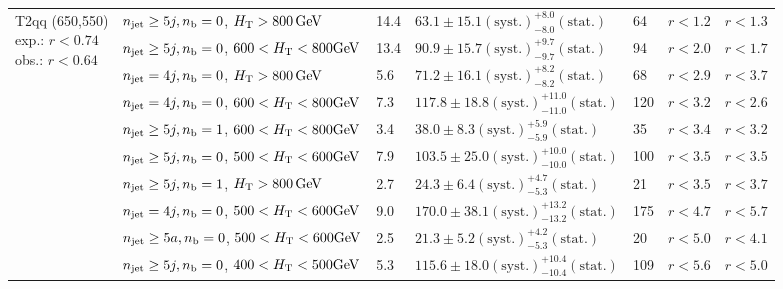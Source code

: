 \begin{table}[h!]
\begin{tabular}{ lllllll }
\multirow{10}{*}{\parbox[t]{2.3cm}{T2qq (650,550)\\exp.: $r<0.74$\\obs.: $r<0.64$}}
 & $n_{\mathrm{jet}} \geq5j,n_{\text{b}} =0$, $\mbox{$H_\text{T}$} > 800 \, \mathrm{GeV}$ & 14.4 & $63.1 \pm 15.1 \mathrm{(syst.)} ^{+8.0}_{-8.0} \mathrm{(stat.)}$ & 64 & $r < 1.2$ & $r < 1.3$\\ 
 & $n_{\mathrm{jet}} \geq5j,n_{\text{b}} =0$, $600 < \mbox{$H_\text{T}$} < 800 \mathrm{GeV}$ & 13.4 & $90.9 \pm 15.7 \mathrm{(syst.)} ^{+9.7}_{-9.7} \mathrm{(stat.)}$ & 94 & $r < 2.0$ & $r < 1.7$\\ 
 & $n_{\mathrm{jet}} =4j,n_{\text{b}} =0$, $\mbox{$H_\text{T}$} > 800 \, \mathrm{GeV}$ & 5.6 & $71.2 \pm 16.1 \mathrm{(syst.)} ^{+8.2}_{-8.2} \mathrm{(stat.)}$ & 68 & $r < 2.9$ & $r < 3.7$\\ 
 & $n_{\mathrm{jet}} =4j,n_{\text{b}} =0$, $600 < \mbox{$H_\text{T}$} < 800 \mathrm{GeV}$ & 7.3 & $117.8 \pm 18.8 \mathrm{(syst.)} ^{+11.0}_{-11.0} \mathrm{(stat.)}$ & 120 & $r < 3.2$ & $r < 2.6$\\ 
 & $n_{\mathrm{jet}} \geq5j,n_{\text{b}} =1$, $600 < \mbox{$H_\text{T}$} < 800 \mathrm{GeV}$ & 3.4 & $38.0 \pm 8.3 \mathrm{(syst.)} ^{+5.9}_{-5.9} \mathrm{(stat.)}$ & 35 & $r < 3.4$ & $r < 3.2$\\ 
 & $n_{\mathrm{jet}} \geq5j,n_{\text{b}} =0$, $500 < \mbox{$H_\text{T}$} < 600 \mathrm{GeV}$ & 7.9 & $103.5 \pm 25.0 \mathrm{(syst.)} ^{+10.0}_{-10.0} \mathrm{(stat.)}$ & 100 & $r < 3.5$ & $r < 3.5$\\ 
 & $n_{\mathrm{jet}} \geq5j,n_{\text{b}} =1$, $\mbox{$H_\text{T}$} > 800 \, \mathrm{GeV}$ & 2.7 & $24.3 \pm 6.4 \mathrm{(syst.)} ^{+4.7}_{-5.3} \mathrm{(stat.)}$ & 21 & $r < 3.5$ & $r < 3.7$\\ 
 & $n_{\mathrm{jet}} =4j,n_{\text{b}} =0$, $500 < \mbox{$H_\text{T}$} < 600 \mathrm{GeV}$ & 9.0 & $170.0 \pm 38.1 \mathrm{(syst.)} ^{+13.2}_{-13.2} \mathrm{(stat.)}$ & 175 & $r < 4.7$ & $r < 5.7$\\ 
 & $n_{\mathrm{jet}} \geq5a,n_{\text{b}} =0$, $500 < \mbox{$H_\text{T}$} < 600 \mathrm{GeV}$ & 2.5 & $21.3 \pm 5.2 \mathrm{(syst.)} ^{+4.2}_{-5.3} \mathrm{(stat.)}$ & 20 & $r < 5.0$ & $r < 4.1$\\ 
 & $n_{\mathrm{jet}} \geq5j,n_{\text{b}} =0$, $400 < \mbox{$H_\text{T}$} < 500 \mathrm{GeV}$ & 5.3 & $115.6 \pm 18.0 \mathrm{(syst.)} ^{+10.4}_{-10.4} \mathrm{(stat.)}$ & 109 & $r < 5.6$ & $r < 5.0$\\ \hline
    \hline
  \end{tabular}
\end{table}




